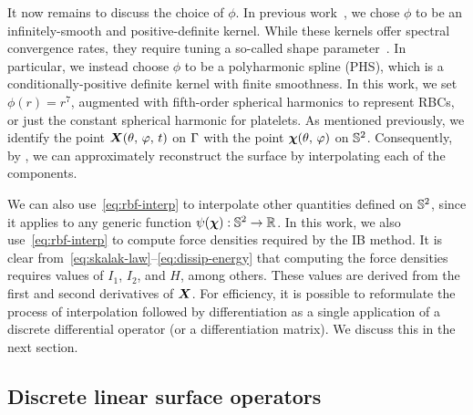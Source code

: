 It now remains to discuss the choice of $\phi$. In previous work~\cite{Shankar:2015km},
we chose $\phi$ to be an infinitely-smooth and positive-definite kernel. While these
kernels offer spectral convergence rates, they require tuning a so-called shape
parameter~\cite{Fasshauer:2007ui}. In particular, we instead choose $\phi$ to be a
polyharmonic spline (PHS), which is a conditionally-positive definite kernel with finite
smoothness. In this work, we set $\phi(r) = r^7$, augmented with fifth-order spherical
harmonics to represent RBCs, or just the constant spherical harmonic for platelets. As
mentioned previously, we identify the point $\boldsymbol{X}(\theta,\,\varphi,\,t)$ on $\Gamma$
with the point $\boldsymbol{\chi}(\theta,\,\varphi)$ on $\mathbb{S}^2$. Consequently, by , we can approximately reconstruct the surface by
interpolating each of the components. 

We can also use~\eqref{eq:rbf-interp} to interpolate other quantities defined on
$\mathbb{S}^2$, since it applies to any generic function $\psi(\boldsymbol{\chi}): \mathbb{S}^2 \to \mathbb{R}$.
In this work, we also use~\eqref{eq:rbf-interp} to compute force densities required by
the IB method. It is clear from~\eqref{eq:skalak-law}--\eqref{eq:dissip-energy} that
computing the force densities requires values of $I_1$, $I_2$, and $H$, among others.
These values are derived from the first and second derivatives of $\boldsymbol{X}$. For efficiency,
it is possible to reformulate the process of interpolation followed by differentiation as
a single application of a discrete differential operator (or a differentiation matrix).
We discuss this in the next section.

\subsection{Discrete linear surface operators}

